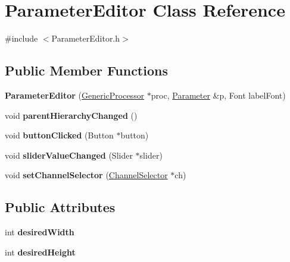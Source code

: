 \hypertarget{classParameterEditor}{\section{Parameter\-Editor Class Reference}
\label{classParameterEditor}
}


{\ttfamily \#include $<$Parameter\-Editor.\-h$>$}

\subsection*{Public Member Functions}
\begin{DoxyCompactItemize}
\item 
\hypertarget{classParameterEditor_a5dc3516d57088e43b2594077abac9229}{{\bfseries Parameter\-Editor} (\hyperlink{classGenericProcessor}{Generic\-Processor} $\ast$proc, \hyperlink{classParameter}{Parameter} \&p, Font label\-Font)}\label{classParameterEditor_a5dc3516d57088e43b2594077abac9229}

\item 
\hypertarget{classParameterEditor_a3642982edfaf45fcd4a75251de47a7d1}{void {\bfseries parent\-Hierarchy\-Changed} ()}\label{classParameterEditor_a3642982edfaf45fcd4a75251de47a7d1}

\item 
\hypertarget{classParameterEditor_aa4cc89334e9f4060253a68854ffbf6a5}{void {\bfseries button\-Clicked} (Button $\ast$button)}\label{classParameterEditor_aa4cc89334e9f4060253a68854ffbf6a5}

\item 
\hypertarget{classParameterEditor_a4d01772de9fcc90aa059172aac956183}{void {\bfseries slider\-Value\-Changed} (Slider $\ast$slider)}\label{classParameterEditor_a4d01772de9fcc90aa059172aac956183}

\item 
\hypertarget{classParameterEditor_a2bbf1ac9398bb026cb2de2f493ab7c08}{void {\bfseries set\-Channel\-Selector} (\hyperlink{classChannelSelector}{Channel\-Selector} $\ast$ch)}\label{classParameterEditor_a2bbf1ac9398bb026cb2de2f493ab7c08}

\end{DoxyCompactItemize}
\subsection*{Public Attributes}
\begin{DoxyCompactItemize}
\item 
\hypertarget{classParameterEditor_aaf62ff28c11605e190aa098d0af13907}{int {\bfseries desired\-Width}}\label{classParameterEditor_aaf62ff28c11605e190aa098d0af13907}

\item 
\hypertarget{classParameterEditor_a558f492aa13acaef4cd65132fbbcdc9f}{int {\bfseries desired\-Height}}\label{classParameterEditor_a558f492aa13acaef4cd65132fbbcdc9f}

\end{DoxyCompactItemize}
